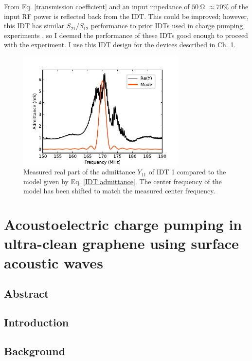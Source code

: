 \documentclass[double,12pt,1in]{beavtex}
\begin{document}
From Eq. \ref{transmission coefficient} and an input impedance of $\SI{50}{\ohm}$ $\approx 70\%$ of the input RF power is reflected back from the IDT. This could be improved; however, this IDT has similar $S_{21}/S_{12}$ performance to prior IDTs used in charge pumping experiments \cite{buitelaar_charge_2006}, so I deemed the performance of these IDTs good enough to proceed with the experiment. I use this IDT design for the devices described in Ch. \ref{AE charge pumping paper}.

\begin{figure}
    \includegraphics[width = 0.75\textwidth]{Z11_plot_.pdf}
    \caption{Measured real part of the admittance $Y_{11}$ of IDT 1 compared to the model given by Eq. \ref{IDT admittance}. The center frequency of the model has been shifted to match the measured center frequency.}
    \label{Z11 plot}
\end{figure}


\chapter{Acoustoelectric charge pumping in ultra-clean graphene using surface acoustic waves} \label{AE charge pumping paper}

\section{Abstract}

\section{Introduction} 

\section{Background}
\end{document}
